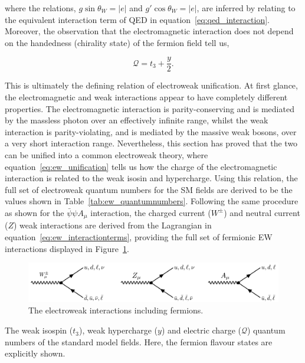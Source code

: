 \noindent
where the relations, $g\sin{\theta_W}=|e|$ and $g'\cos{\theta_W}=|e|$, are inferred by relating to the equivalent interaction term of QED in equation~\ref{eq:qed_interaction}. Moreover, the observation that the electromagnetic interaction does not depend on the handedness (chirality state) of the fermion field tell us,

\begin{equation}\label{eq:ew_unification}
    \mathcal{Q} = t_3 + \frac{y}{2}.
\end{equation}

\noindent
This is ultimately the defining relation of electroweak unification. At first glance, the electromagnetic and weak interactions appear to have completely different properties. The electromagnetic interaction is parity-conserving and is mediated by the massless photon over an effectively infinite range, whilst the weak interaction is parity-violating, and is mediated by the massive weak bosons, over a very short interaction range. Nevertheless, this section has proved that the two can be unified into a common electroweak theory, where equation~\ref{eq:ew_unification} tells us how the charge of the electromagnetic interaction is related to the weak isosin and hypercharge. Using this relation, the full set of electroweak quantum numbers for the SM fields are derived to be the values shown in Table~\ref{tab:ew_quantumnumbers}. Following the same procedure as shown for the $\bar{\psi}\psi A_\mu$ interaction, the charged current ($W^{\pm}$) and neutral current ($Z$) weak interactions are derived from the Lagrangian in equation~\ref{eq:ew_interactionterms}, providing the full set of fermionic EW interactions displayed in Figure~\ref{fig:feynman_ew}.

\begin{figure}[htb!]
  \centering
  \includegraphics[width=.9\linewidth]{Figures/theory/ew_interaction.pdf}
  \caption[The electroweak interaction including fermions]
  {
    The electroweak interactions including fermions.
  }
  \label{fig:feynman_ew}
\end{figure}

\begin{table}[htb!]
    \caption[The electroweak quantum numbers of the SM fields]{The weak isospin ($t_3$), weak hypercharge ($y$) and electric charge ($\mathcal{Q}$) quantum numbers of the standard model fields. Here, the fermion flavour states are explicitly shown.}
    \label{tab:ew_quantumnumbers}
    \centering
    \renewcommand{\arraystretch}{1.2}
    \setlength{\tabcolsep}{20pt}
    
\end{table}

